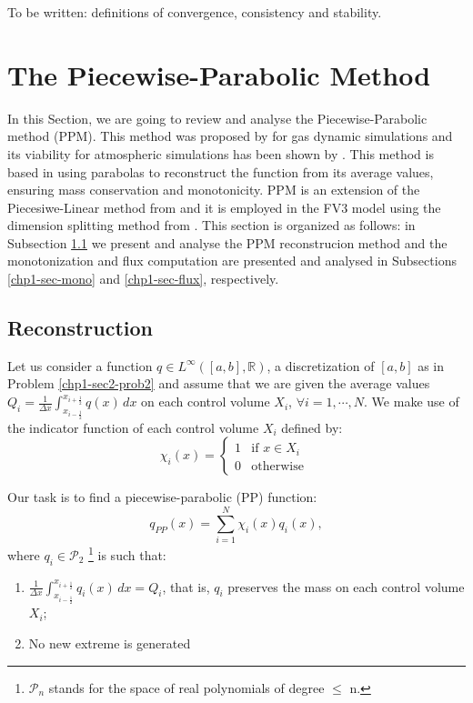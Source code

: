 To be written: definitions of convergence, consistency and stability.

\section{The Piecewise-Parabolic Method}
\label{chp1-sec-ppm}
In this Section, we are going to review and analyse the Piecewise-Parabolic method (PPM).
This method was proposed by \citet{colella:1984} for gas dynamic simulations and
its viability for atmospheric simulations has been shown by \citet{carpenter:1990}.
This method is based in using parabolas to reconstruct the function from its 
average values, ensuring mass conservation and monotonicity.
PPM is an extension of the Piecesiwe-Linear method from \citet{vanleer:1977}
and it is employed in the FV3 model using the dimension splitting method from \citet{lin:1996}.
This section is organized as follows: in Subsection \ref{chp1-sec-recon} 
we present and analyse the PPM reconstrucion method and the monotonization and 
flux computation are presented and analysed in Subsections 
\ref{chp1-sec-mono} and \ref{chp1-sec-flux}, respectively.


\subsection{Reconstruction}
\label{chp1-sec-recon}
Let us consider a function ${q} \in L^{\infty}([a, b],\mathbb{R})$, a discretization of
$[a,b]$ as in Problem \ref{chp1-sec2-prob2}
and assume that we are given the average values ${Q}_i = \frac{1}{\Delta x} 
\int_{x_{i-\frac{1}{2}}}^{x_{i+\frac{1}{2}}} {q}(x) \,dx$
on each control volume $X_i$, $\forall i = 1, \cdots, N $.
We make use of the indicator function of each control volume $X_i$ defined by:
\begin{equation}
	\label{chp1-sec3-1-eq1}
	\chi_{i}(x)=
	\begin{cases}
		1 & \text{if } x \in X_i\\
		0 & \text{otherwise }
	\end{cases}
\end{equation}

Our task is to find a piecewise-parabolic (PP) 
function:
\begin{equation}
	\label{chp1-sec3-1-eq2}
	q_{PP}(x) = \sum_{i=1}^{N} \chi_i(x) q_i(x),
\end{equation}
where ${q}_i \in \mathcal{P}_2$
\footnote{$\mathcal{P}_n$ stands for the space of real polynomials of degree $\leq$ n.} 
is such that:
\begin{enumerate}
	\item $\frac{1}{\Delta x}\int_{x_{i-\frac{1}{2}}}^{x_{i+\frac{1}{2}}} {q}_i(x) \,dx = {Q}_i$,
	that is, $q_i$ preserves the mass on each control volume $X_i$;
	\item No new extreme is generated%
\end{enumerate}

